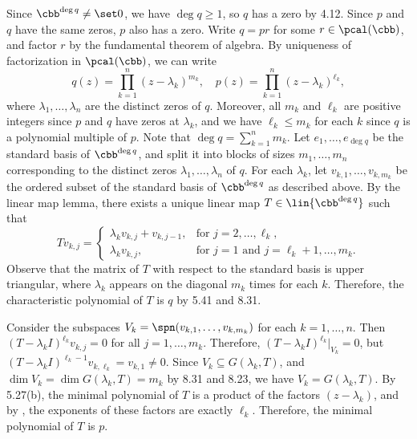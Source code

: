 \begin{sol}
    Since $\cbb^{\deg q} \neq \set 0$, we have $\deg q \geq 1$, so $q$ has a zero by 4.12.
    Since $p$ and $q$ have the same zeros, $p$ also has a zero.
    Write $q = p r$ for some $r \in \pcal(\cbb)$, and factor $r$ by the fundamental theorem of algebra.
    By uniqueness of factorization in $\pcal(\cbb)$, we can write
    \[
        q(z) = \prod_{k=1}^n (z - \lambda_k)^{m_k}, \quad
        p(z) = \prod_{k=1}^n (z - \lambda_k)^{\ell_k},
    \]
    where $\lambda_1, \ldots, \lambda_n$ are the distinct zeros of $q$.
    Moreover, all $m_k$ and $\ell_k$ are positive integers since $p$ and $q$ have zeros at $\lambda_k$, and we have $\ell_k \leq m_k$ for each $k$ since $q$ is a polynomial multiple of $p$.
    Note that $\deg q = \sum_{k=1}^n m_k$.
    Let $e_1, \ldots, e_{\deg q}$ be the standard basis of $\cbb^{\deg q}$, and split it into blocks of sizes $m_1, \ldots, m_n$ corresponding to the distinct zeros $\lambda_1, \ldots, \lambda_n$ of $q$.
    For each $\lambda_k$, let $v_{k, 1}, \ldots, v_{k, m_k}$ be the ordered subset of the standard basis of $\cbb^{\deg q}$ as described above.
    By the linear map lemma, there exists a unique linear map $T \in \lin{\cbb^{\deg q}}$ such that
    \[
        T v_{k, j} = 
        \begin{cases}
            \lambda_k v_{k, j} + v_{k, j-1}, & \text{for } j = 2, \ldots, \ell_k, \\
            \lambda_k v_{k, j}, & \text{for } j = 1 \text{ and } j = \ell_k + 1, \ldots, m_k.
        \end{cases}
    \]
    Observe that the matrix of $T$ with respect to the standard basis is upper triangular, where $\lambda_k$ appears on the diagonal $m_k$ times for each $k$.
    Therefore, the characteristic polynomial of $T$ is $q$ by 5.41 and 8.31.

    Consider the subspaces $V_k = \spn(v_{k, 1}, \ldots, v_{k, m_k})$ for each $k = 1, \ldots, n$.
    Then $(T - \lambda_k I)^{\ell_k} v_{k, j} = 0$ for all $j = 1, \ldots, m_k$.
    Therefore, $(T - \lambda_k I)^{\ell_k}|_{V_k} = 0$, but $(T - \lambda_k I)^{\ell_k - 1} v_{k, \ell_k} = v_{k, 1} \neq 0$.
    Since $V_k \subseteq G(\lambda_k, T)$, and $\dim V_k = \dim G(\lambda_k, T) = m_k$ by 8.31 and 8.23, we have $V_k = G(\lambda_k, T)$.
    By 5.27(b), the minimal polynomial of $T$ is a product of the factors $(z - \lambda_k)$, and by , the exponents of these factors are exactly $\ell_k$.
    Therefore, the minimal polynomial of $T$ is $p$.
\end{sol}

